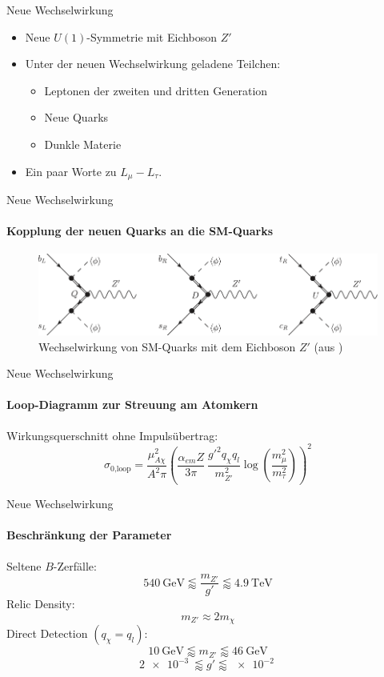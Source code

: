 \begin{frame}{Neue Wechselwirkung}
\begin{itemize}
	\setlength\itemsep{1em}
	\item Neue $U(1)$-Symmetrie mit Eichboson $Z'$ \cite{InColour}
	\item Unter der neuen Wechselwirkung geladene Teilchen:
	\begin{itemize}
		\item Leptonen der zweiten und dritten Generation
		\item Neue Quarks
		\item Dunkle Materie \cite{Z}
	\end{itemize}
	\item Ein paar Worte zu $L_\mu-L_\tau$.
\end{itemize}
\end{frame}

\begin{frame}{Neue Wechselwirkung}
\framesubtitle{Kopplung der neuen Quarks an die SM-Quarks}
\begin{figure}
	\includegraphics[width=\textwidth]{Bilder/NeueQuarks.pdf}
	\caption{Wechselwirkung von SM-Quarks mit dem Eichboson $Z'$ (aus \cite{InColour})}
\end{figure}
\end{frame}

\begin{frame}{Neue Wechselwirkung}
\framesubtitle{Loop-Diagramm zur Streuung am Atomkern}
\begin{minipage}{.25\textwidth}
		\resizebox{1.4\textwidth}{!}{
			
		}
\end{minipage}
\hfill
\begin{minipage}{.7\textwidth}
	Wirkungsquerschnitt ohne Impulsübertrag:
	\[ \sigma_\text{0,loop} = \frac{\mu_{A\chi}^2}{A^2\pi}\left(\frac{\alpha_{em}Z}{3\pi}\ \frac{g'^2q_\chi q_l}{m_{Z'}^2}\log\left(\frac{m_\mu^2}{m_\tau^2}\right)\right)^2 \]
\end{minipage}
\end{frame}

\begin{frame}{Neue Wechselwirkung}
\framesubtitle{Beschränkung der Parameter}
Seltene $B$-Zerfälle:
	\[ \SI{540}{\giga\electronvolt}\lessapprox\frac{m_{Z'}}{g'}\lessapprox\SI{4.9}{\tera\electronvolt} \]
Relic Density:
	\[ m_{Z'}\approx 2m_\chi \]
Direct Detection $(q_\chi=q_l)$:
	\[ \SI{10}{\giga\electronvolt}\lessapprox m_{Z'} \lessapprox\SI{46}{\giga\electronvolt} \]
	\[ \SI{2e-3}{}\lessapprox g' \lessapprox\SI{e-2}{} \]
\end{frame}
